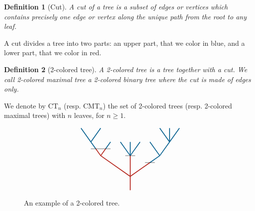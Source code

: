 \documentclass[twoside, 12pt]{amsart}
\newtheorem{definition}{Definition}[section]
\theoremstyle{remark}
\newcommand{\CT}[1]{\mathrm{CT}_{#1}}
\newcommand{\CMT}[1]{\mathrm{CMT}_{#1}}
\begin{document}
\begin{definition}[Cut]
A \emph{cut} of a tree is a subset of edges or vertices which contains precisely one edge or vertex along the unique path from the root to any leaf.
\end{definition}

A cut divides a tree into two parts: an upper part, that we color in blue, and a lower part, that we color in red.  

\begin{definition}[2-colored tree]
A \emph{2-colored tree} is a tree together with a cut. We call \emph{2-colored maximal tree} a 2-colored binary tree where the cut is made of edges only. 
\end{definition}
We denote by $\CT{n}$ (resp. $\CMT{n}$) the set of 2-colored trees (resp. 2-colored maximal trees) with $n$ leaves, for $n\geq 1$. 

\begin{figure}[h]
\[\vcenter{\hbox{
\begin{tikzpicture}[yscale=0.7,xscale=1]
\draw[very thick, MidnightBlue] (-2.5,3.5)--(-2,2.5);
\draw[very thick, MidnightBlue] (-1.5,3.5)--(-2,2.5);
\draw[very thick, MidnightBlue] (-2,2.5) -- (-1.75,2);
\draw[very thick, MidnightBlue] (-1.25, 2) -- (-1,2.5);
\draw[very thick, MidnightBlue] (-0.5,2.5) -- (0,1.5);
\draw[very thick, MidnightBlue] (0,1.5)--(0,2.5);
\draw[very thick, MidnightBlue] (0,1.5)--(0.5,2.5);
\draw[very thick, MidnightBlue] (1,1)--(1.5,1.5);
\draw[very thick, MidnightBlue] (1.5,1.5)--(1,2.5);
\draw[very thick, MidnightBlue] (1.5,1.5)--(2,2.5);
\draw[very thick, MidnightBlue] (2,2.5)--(1.5,3.5);
\draw[very thick, MidnightBlue] (2,2.5)--(2,3.5);
\draw[very thick, MidnightBlue] (2,2.5)--(2.5,3.5);
\draw[very thick, BrickRed] (0,-1)--(0, 1.5); 
\draw[very thick, BrickRed] (0,0)--(-1.5,1.5);
\draw[very thick, BrickRed] (-1.5,1.5)--(-1.75, 2); 
\draw[very thick, BrickRed] (-1.5,1.5)--(-1.25, 2); 
\draw[very thick, BrickRed] (0,0)--(1, 1);
\draw (-2,2) to (-1,2); 
\draw (-0.25,1.5)-- (0.25, 1.5) ; 
\draw (0.75,1) to (1.25,1);
\end{tikzpicture}}}\]
\caption{An example of a 2-colored tree.}
\label{Fig1:2ColTree}
\end{figure}
\end{document}
